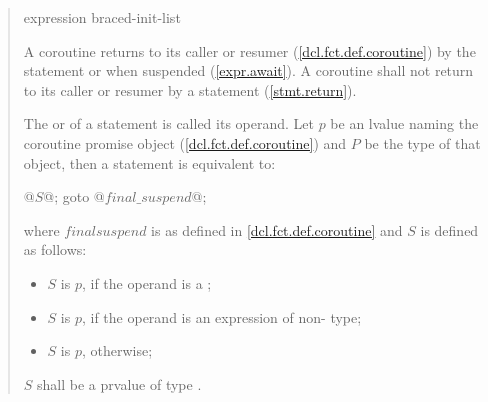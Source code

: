 \begin{quote}

\begin{bnf}
	\br
	 expression\opt \terminal{;}\br
	 braced-init-list\terminal{;}
\end{bnf}

\pnum
A coroutine returns to its caller or resumer (\ref{dcl.fct.def.coroutine}) by the  statement
or when suspended (\ref{expr.await}). A coroutine shall not return to its caller or resumer by a  statement (\ref{stmt.return}).

\pnum
The  or  of a  statement is called its operand.
Let $p$ be an lvalue naming the coroutine promise object (\ref{dcl.fct.def.coroutine}) and $P$ be the type of that object, 
then a  statement is equivalent to:

 

\begin{codeblock}
  { @$S$@; goto @$final{\_}suspend$@; }
\end{codeblock}

where $final$\tcode{\_}$suspend$ is as defined in \ref{dcl.fct.def.coroutine} and $S$ is defined as follows:

\begin{itemize}
  \item $S$ is  $p$\tcode{)}, if the operand is a ;
  \item $S$ is  $p$\tcode{)}, if the operand is an expression of non- type;
  \item $S$ is \tcode{\{}{ }\opt \tcode{;} $p$\tcode{;{ }\}}, otherwise;
\end{itemize}
$S$ shall be a prvalue of type .


\end{quote}
